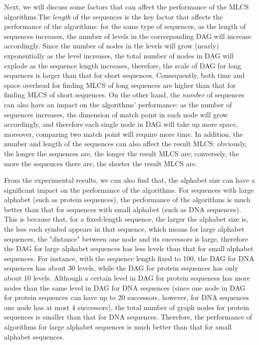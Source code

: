 \documentclass[utf8]{frontiersSCNS} %
\begin{document}
Next, we will discuss some factors that can affect the performance of
the MLCS algorithms.The \emph{length} of the sequences is the key
factor that affects the performance of the algorithms: for the same
type of sequences, as the length of sequences increases, the number of
levels in the corresponding DAG will increase accordingly. Since the
number of nodes in the levels will grow (nearly) exponentially as the
level increases, the total number of nodes in DAG will explode as the
sequence length increases, therefore, the scale of DAG for long
sequences is larger than that for short sequences. Consequently, both
time and space overhead for finding MLCS of long sequences are higher
than that for finding MLCS of short sequences. On the other hand, the
\emph{number} of sequences can also have an impact on the algorithms'
performance: as the number of sequences increases, the dimension of
match point in each node will grow accordingly, and therefore each
single node in DAG will take up more space, moreover, comparing two
match point will require more time. In addition, the number and length
of the sequences can also affect the result MLCS: obviously, the
longer the sequences are, the longer the result MLCS are; conversely,
the more the sequences there are, the shorter the result MLCS are.

From the experimental results, we can also find that, the alphabet
size can have a significant impact on the performance of the
algorithms. For sequences with large alphabet (such as protein
sequences), the performance of the algorithms is much better than that
for sequences with small alphabet (such as DNA sequences). This is
because that, for a fixed-length sequence, the larger the alphabet
size is, the less each symbol appears in that sequence, which means
for large alphabet sequences, the "distance" between one node and its
successors is large, therefore the DAG for large alphabet sequences
has less levels than that for small alphabet sequences. For instance,
with the sequence length fixed to 100, the DAG for DNA sequences has
about 30 levels, while the DAG for protein sequences has only about 10
levels. Although a certain level in DAG for protein sequences has more
nodes than the same level in DAG for DNA sequences (since one node in
DAG for protein sequences can have up to 20 successors, however, for
DNA sequences one node has at most 4 successors), the total number of
graph nodes for protein sequences is smaller than that for DNA
sequences. Therefore, the performance of algorithms for large alphabet
sequences is much better than that for small alphabet sequences.
\end{document}
